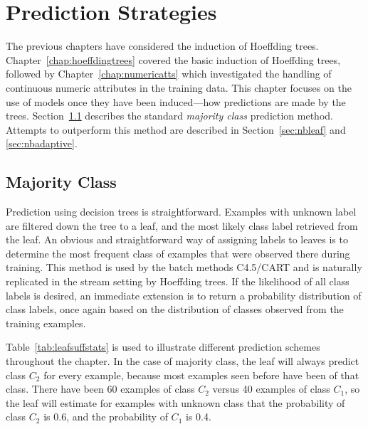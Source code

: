 \chapter{Prediction Strategies}
\label{chap:predstrat} 

The previous chapters have considered the induction of Hoeffding trees.
Chapter~\ref{chap:hoeffdingtrees} covered the basic induction of Hoeffding trees, followed by Chapter~\ref{chap:numericatts} which investigated the handling of continuous numeric attributes in the training data. This chapter focuses on the use of models once they have been induced---how predictions are made by the trees. Section~\ref{sec:majclass} describes the standard {\em majority class} prediction method. Attempts to outperform this method are described in Section~\ref{sec:nbleaf} and \ref{sec:nbadaptive}. %

\section{Majority Class}
\label{sec:majclass}

Prediction using decision trees is straightforward. Examples with unknown label are filtered down the tree to a leaf, and the most likely class label retrieved from the leaf. An obvious and straightforward way of assigning labels to leaves is to determine the most frequent class of examples that were observed there during training. This method is used by the batch methods C4.5/CART and is naturally replicated in the stream setting by Hoeffding trees. If the likelihood of all class labels is desired, an immediate extension is to return a probability distribution of class labels, once again based on the distribution of classes observed from the training examples.

Table~\ref{tab:leafsuffstats} is used to illustrate different prediction schemes throughout the chapter. In the case of majority class, the leaf will always predict class $C_{2}$ for every example, because most examples seen before have been of that class. There have been 60 examples of class $C_{2}$ versus 40 examples of class $C_{1}$, so the leaf will estimate for examples with unknown class that the probability of class $C_{2}$ is 0.6, and the probability of $C_{1}$ is 0.4.

